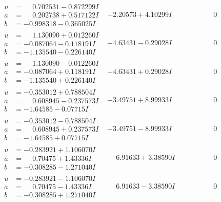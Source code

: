 \documentclass[1p]{elsarticle_modified}
\theoremstyle{definition}
\begin{document}
$$\begin{array}{c|c|c}
\begin{aligned}
u &= \phantom{-}0.702531 - 0.872299 I \\
a &= \phantom{-}0.202738 + 0.517122 I \\
b &= -0.998318 - 0.365025 I\end{aligned}
 & -2.20573 + 4.10299 I & \phantom{-0.000000 } 0 \\ \hline\begin{aligned}
u &= \phantom{-}1.130090 + 0.012260 I \\
a &= -0.087064 - 0.118191 I \\
b &= -1.135540 - 0.226140 I\end{aligned}
 & -4.63431 - 0.29028 I & \phantom{-0.000000 } 0 \\ \hline\begin{aligned}
u &= \phantom{-}1.130090 - 0.012260 I \\
a &= -0.087064 + 0.118191 I \\
b &= -1.135540 + 0.226140 I\end{aligned}
 & -4.63431 + 0.29028 I & \phantom{-0.000000 } 0 \\ \hline\begin{aligned}
u &= -0.353012 + 0.788504 I \\
a &= \phantom{-}0.608945 - 0.237573 I \\
b &= -1.64585 - 0.07715 I\end{aligned}
 & -3.49751 + 8.99933 I & \phantom{-0.000000 } 0 \\ \hline\begin{aligned}
u &= -0.353012 - 0.788504 I \\
a &= \phantom{-}0.608945 + 0.237573 I \\
b &= -1.64585 + 0.07715 I\end{aligned}
 & -3.49751 - 8.99933 I & \phantom{-0.000000 } 0 \\ \hline\begin{aligned}
u &= -0.283921 + 1.106070 I \\
a &= \phantom{-}0.70475 + 1.43336 I \\
b &= -0.308285 - 1.271040 I\end{aligned}
 & \phantom{-}6.91633 + 3.38590 I & \phantom{-0.000000 } 0 \\ \hline\begin{aligned}
u &= -0.283921 - 1.106070 I \\
a &= \phantom{-}0.70475 - 1.43336 I \\
b &= -0.308285 + 1.271040 I\end{aligned}
 & \phantom{-}6.91633 - 3.38590 I & \phantom{-0.000000 } 0 \\ \hline\begin{aligned}

\end{aligned}
\end{array}$$
\end{document}
